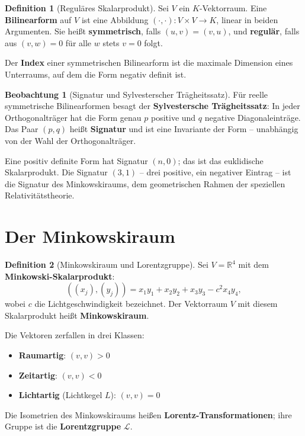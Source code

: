 ﻿\documentclass[a4paper,12pt]{report}
\theoremstyle{definition}
\newtheorem{definition}{Definition}
\newtheorem{beobachtung}{Beobachtung}
\begin{document}
\begin{definition}[Reguläres Skalarprodukt]
    Sei $V$ ein $K$-Vektorraum. Eine \textbf{Bilinearform} auf $V$ ist
    eine Abbildung $(\cdot, \cdot) : V \times V \to K$, linear in beiden
    Argumenten. Sie heißt \textbf{symmetrisch}, falls $(u,v) = (v,u)$,
    und \textbf{regulär}, falls aus $(v, w) = 0$ für alle $w$ stets
    $v = 0$ folgt.

    Der \textbf{Index} einer symmetrischen Bilinearform ist die maximale
    Dimension eines Unterraums, auf dem die Form negativ definit ist.
\end{definition}

\begin{beobachtung}[Signatur und Sylvesterscher Trägheitssatz]
    Für reelle symmetrische Bilinearformen besagt der \textbf{Sylvestersche
    Trägheitssatz}: In jeder Orthogonalträger hat die Form genau
    $p$ positive und $q$ negative Diagonaleinträge. Das Paar $(p,q)$
    heißt \textbf{Signatur} und ist eine Invariante der Form -- unabhängig
    von der Wahl der Orthogonalträger.

    Eine positiv definite Form hat Signatur $(n, 0)$; das ist das
    euklidische Skalarprodukt. Die Signatur $(3, 1)$ -- drei positive,
    ein negativer Eintrag -- ist die Signatur des Minkowskiraums,
    dem geometrischen Rahmen der speziellen Relativitätstheorie.
\end{beobachtung}

\section{Der Minkowskiraum}

\begin{definition}[Minkowskiraum und Lorentzgruppe]
    Sei $V = \mathbb{R}^4$ mit dem \textbf{Minkowski-Skalarprodukt}:
    \[
        ((x_j), (y_j)) = x_1 y_1 + x_2 y_2 + x_3 y_3 - c^2 x_4 y_4,
    \]
    wobei $c$ die Lichtgeschwindigkeit bezeichnet. Der Vektorraum $V$
    mit diesem Skalarprodukt heißt \textbf{Minkowskiraum}.

    Die Vektoren zerfallen in drei Klassen:
    \begin{itemize}
        \item[-] \textbf{Raumartig}: $(v, v) > 0$
        \item[-] \textbf{Zeitartig}: $(v, v) < 0$
        \item[-] \textbf{Lichtartig} (Lichtkegel $L$): $(v, v) = 0$
    \end{itemize}
    Die Isometrien des Minkowskiraums heißen \textbf{Lorentz-Transformationen};
    ihre Gruppe ist die \textbf{Lorentzgruppe} $\mathcal{L}$.
\end{definition}
\end{document}
